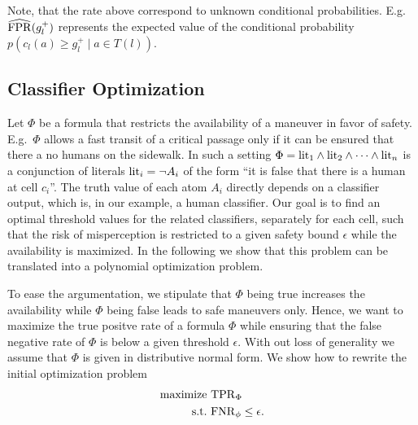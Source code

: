 Note, that the rate above correspond to unknown conditional probabilities. E.g.\
$\widehat{\mathrm{FPR}}(g_l^+)$ represents the expected value of the conditional probability $p( c_l(a)\geq g_l^+ \mid a\in T(l))$.

\subsection{Classifier Optimization}
Let $\Phi$ be a formula that restricts the availability of a maneuver in favor of safety. 
E.g.\ $\Phi$ allows a fast transit of a critical passage only if it can be ensured that there a no humans on the sidewalk. In such a setting $\Phi = \mathrm{lit}_1 \land \mathrm{lit}_2 \land \dots \land \mathrm{lit}_n$ is a conjunction of literals $\mathrm{lit}_i=\lnot A_i$ of the form ``it is false that there is a human at cell $c_i$''. The truth value of each atom $A_i$ directly depends on a classifier output, which is, in our example, a human classifier. Our goal is to find an optimal threshold values for the related classifiers, separately for each cell,
such that the risk of misperception is restricted to a given safety bound
$\epsilon$ while the availability is maximized. In the following we show that
this problem can be translated into a polynomial optimization problem.

To ease the argumentation, we stipulate that $\Phi$ being true increases
the availability while $\Phi$ being false leads to safe
maneuvers only. Hence, we want to maximize the true positve rate of a formula $\Phi$ while ensuring that the false negative rate of $\Phi$ is below a given threshold $\epsilon$. With out loss of generality we assume that $\Phi$ is given in distributive normal form. We show how
to rewrite the initial optimization problem
\begin{align*}
  \textrm{maximize} &\ \mathrm{TPR}_\Phi\\
  \textrm{s.t.} &\ \mathrm{FNR}_\phi\leq \epsilon\text.
\end{align*}

